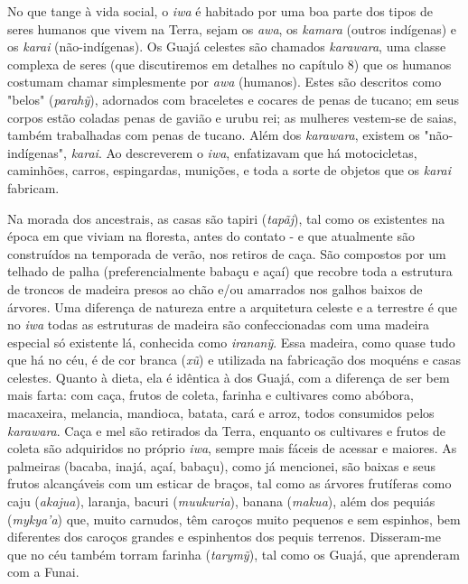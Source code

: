 No que tange à vida social, o \emph{iwa} é habitado por uma boa parte
dos tipos de seres humanos que vivem na Terra, sejam os \emph{awa}, os
\emph{kamara} (outros indígenas) e os \emph{karai} (não-indígenas). Os
Guajá celestes são chamados \emph{karawara}, uma classe complexa de
seres (que discutiremos em detalhes no capítulo 8) que os humanos
costumam chamar simplesmente por \emph{awa} (humanos). Estes são
descritos como "belos" (\emph{parahỹ}), adornados com braceletes e
cocares de penas de tucano; em seus corpos estão coladas penas de gavião
e urubu rei; as mulheres vestem-se de saias, também trabalhadas com
penas de tucano. Além dos \emph{karawara}, existem os "não-indígenas",
\emph{karai}. Ao descreverem o \emph{iwa}, enfatizavam que há
motocicletas, caminhões, carros, espingardas, munições, e toda a sorte
de objetos que os \emph{karai} fabricam.

Na morada dos ancestrais, as casas são tapiri (\emph{tapãj}), tal como
os existentes na época em que viviam na floresta, antes do contato - e
que atualmente são construídos na temporada de verão, nos retiros de
caça. São compostos por um telhado de palha (preferencialmente babaçu e
açaí) que recobre toda a estrutura de troncos de madeira presos ao chão
e/ou amarrados nos galhos baixos de árvores. Uma diferença de natureza
entre a arquitetura celeste e a terrestre é que no \emph{iwa} todas as
estruturas de madeira são confeccionadas com uma madeira especial só
existente lá, conhecida como \emph{irananỹ}. Essa madeira, como quase
tudo que há no céu, é de cor branca (\emph{xũ}) e utilizada na
fabricação dos moquéns e casas celestes. Quanto à dieta, ela é idêntica
à dos Guajá, com a diferença de ser bem mais farta: com caça, frutos de
coleta, farinha e cultivares como abóbora, macaxeira, melancia,
mandioca, batata, cará e arroz, todos consumidos pelos \emph{karawara}.
Caça e mel são retirados da Terra, enquanto os cultivares e frutos de
coleta são adquiridos no próprio \emph{iwa}, sempre mais fáceis de
acessar e maiores. As palmeiras (bacaba, inajá, açaí, babaçu), como já
mencionei, são baixas e seus frutos alcançáveis com um esticar de
braços, tal como as árvores frutíferas como caju (\emph{akajua}),
laranja, bacuri (\emph{muukuria}), banana (\emph{makua}), além dos
pequiás (\emph{mykya'a}) que, muito carnudos, têm caroços muito pequenos
e sem espinhos, bem diferentes dos caroços grandes e espinhentos dos
pequis terrenos. Disseram-me que no céu também torram farinha
(\emph{tarymỹ}), tal como os Guajá, que aprenderam com a Funai.

